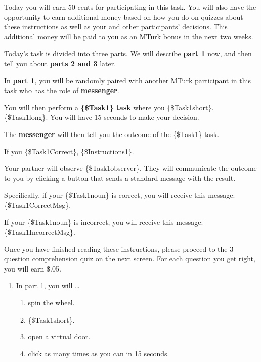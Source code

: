 \begin{description}[listparindent = 1.5em]
\item[Overview Instructions] \hspace{1cm}

Today you will earn 50 cents for participating in this task. You
will also have the opportunity to earn additional money based on how you do on
quizzes about these instructions as well as your and other participants'
decisions. This additional money will be paid to you as an MTurk bonus in the
next two weeks. 

Today's task is divided into three parts. We will describe \textbf{part
1} now, and then tell you about \textbf{parts 2 and 3} later.

\item[Part 1 Instructions: \{\$Task1\} task] \hspace{1cm}

In \textbf{part 1}, you will be randomly paired
with another MTurk participant in this task who has the role of \textbf{messenger}. 

You 
will then perform a \textbf{\{\$Task1\} task} where you \{\$Task1short\}. \{\$Task1long\}. You
will have 15 seconds to make your decision. 

The \textbf{messenger} will then tell you the
outcome of the \{\$Task1\} task. 

If you \{\$Task1Correct\}, \{\$Instructions1\}.

Your partner will observe
\{\$Task1observer\}. They will communicate the outcome to you by clicking a button
that sends a standard message with the result. 

Specifically, if your \{\$Task1noun\}
is correct, you will receive this message: \{\$Task1CorrectMsg\}. 

If your
\{\$Task1noun\} is incorrect, you will receive this message: \{\$Task1IncorrectMsg\}.

Once you have finished reading these instructions, please proceed to the
3-question comprehension quiz on the next screen. For each question you get
right, you will earn \$.05.

\item[Part 1 Quiz Question 1] \hspace{1cm}
\begin{enumerate}
\item In part 1, you will \ldots
\begin{enumerate}
    \item spin the wheel. 
    \item \{\$Task1short\}. 
    \item open a virtual door. 
    \item click as many times as you can in 15 seconds. 
\end{enumerate}
\end{enumerate}


\end{description}
